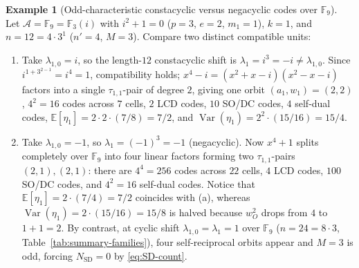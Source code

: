 \documentclass[preprint,12pt]{elsarticle}
\newcommand{\F}{\mathbb F}
\newcommand{\A}{\mathcal A}
\newcommand{\Var}{\operatorname{Var}}
\numberwithin{equation}{section}
\theoremstyle{plain}
\theoremstyle{definition}
\newtheorem{example}[theorem]{Example}
\theoremstyle{remark}
\begin{document}
\begin{example}[Odd-characteristic constacyclic versus negacyclic codes over $\F_9$]\label{ex:F9-constacyclic}
Let $\A=\F_9=\F_3(i)$ with $i^2+1=0$ ($p=3$, $e=2$, $m_1=1$), $k=1$, and
$n=12=4\cdot 3^1$ ($n'=4$, $M=3$). Compare two distinct compatible units:
\begin{enumerate}
\item[\textup{(a)}] Take $\lambda_{1,0}=i$, so the length-$12$ constacyclic shift
is $\lambda_1=i^3=-i\neq\lambda_{1,0}$. Since $i^{1+3^{2-1}}=i^4=1$, compatibility
holds; $x^4-i=(x^2+x-i)(x^2-x-i)$ factors into a single $\tau_{1,1}$-pair of
degree $2$, giving one orbit $(a_1,w_1)=(2,2)$, $4^2=16$ codes across $7$ cells,
$2$ LCD codes, $10$ SO/DC codes, $4$ self-dual codes, $\mathbb E[\eta_1]=2\cdot 2
\cdot(7/8)=7/2$, and $\Var(\eta_1)=2^2\cdot(15/16)=15/4$.
\item[\textup{(b)}] Take $\lambda_{1,0}=-1$, so $\lambda_1=(-1)^3=-1$ (negacyclic).
Now $x^4+1$ splits completely over $\F_9$ into four linear factors forming two
$\tau_{1,1}$-pairs $(2,1),(2,1)$: there are $4^4=256$ codes across $22$ cells,
$4$ LCD codes, $100$ SO/DC codes, and $4^2=16$ self-dual codes. Notice that
$\mathbb E[\eta_1]=2\cdot(7/4)=7/2$ coincides with \textup{(a)}, whereas
$\Var(\eta_1)=2\cdot(15/16)=15/8$ is halved because $w_O^2$ drops from $4$ to
$1+1=2$. By contrast, at cyclic shift $\lambda_{1,0}=\lambda_1=1$ over $\F_9$
($n=24=8\cdot 3$, Table~\ref{tab:summary-families}), four self-reciprocal orbits
appear and $M=3$ is odd, forcing $N_{\mathrm{SD}}=0$ by \eqref{eq:SD-count}.
\end{enumerate}
\end{example}
\end{document}
